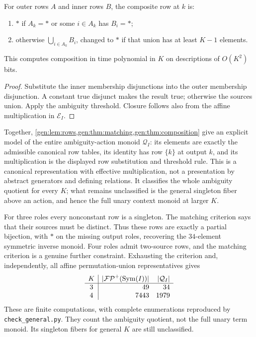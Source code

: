 \begin{proposition}\label{gen:thm:composition}
For outer rows $A$ and inner rows $B$, the composite row at $k$ is:
\begin{enumerate}
\item $*$ if $A_k=*$ or some $i\in A_k$ has $B_i=*$;
\item otherwise $\bigcup_{i\in A_k}B_i$, changed to $*$ if that union
has at least $K-1$ elements.
\end{enumerate}
This computes composition in time polynomial in $K$ on descriptions of
$O(K^2)$ bits.
\end{proposition}
\begin{proof}
Substitute the inner membership disjunctions into the outer membership
disjunction. A constant true disjunct makes the result true; otherwise
the sources union. Apply the ambiguity threshold. Closure follows also
from the affine multiplication in $\mathcal E_I$.
\end{proof}

Together, \cref{gen:lem:rows,gen:thm:matching,gen:thm:composition} give
an explicit model of the entire ambiguity-action monoid $\mathcal Q_I$:
its elements are exactly the admissible canonical row tables, its
identity has row $\{k\}$ at output $k$, and its multiplication is the
displayed row substitution and threshold rule. This is a canonical
representation with effective multiplication, not a presentation by
abstract generators and defining relations. It classifies the whole
ambiguity quotient for every $K$; what remains unclassified is the
general singleton fiber above an action, and hence the full unary
context monoid at larger $K$.

For three roles every nonconstant row is a singleton. The matching
criterion says that their sources must be distinct. Thus these rows
are exactly a partial bijection, with $*$ on the missing output roles,
recovering the $34$-element symmetric inverse monoid. Four roles admit
two-source rows, and the matching criterion is a genuine further
constraint. Exhausting the criterion and, independently, all affine
permutation-union representatives gives
\[
\begin{array}{c|rr}
K&|\mathcal{FP}^{+}(\operatorname{Sym}(I))|&|\mathcal Q_I|\\\hline
3&49&34\\
4&7443&1979
\end{array}
\]
These are finite computations, with complete enumerations reproduced by
\texttt{check\_general.py}. They count the ambiguity quotient, not the
full unary term monoid. Its singleton fibers for general $K$ are still
unclassified.

